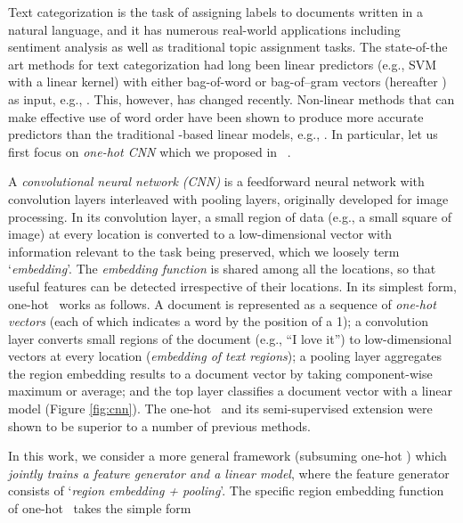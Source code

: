 \documentclass{article}
\begin{document}
Text categorization is the task of assigning labels to documents written in 
a natural language, and it has numerous real-world applications including sentiment analysis 
as well as traditional topic assignment tasks.  
The state-of-the art methods for text categorization had long been linear predictors 
(e.g., SVM with a linear kernel) with either bag-of-word or bag-of--gram vectors 
(hereafter {\em \bow}) as input, 
e.g., \cite{J98,LYRL04}. 
This, however, has changed recently.  
Non-linear methods that can make effective use of word order 
have been shown to produce more accurate predictors than the traditional \bow-based linear models, e.g., 
\cite{DL15,ZZC15}.  
In particular, let us first focus on {\em one-hot CNN} which we proposed in \JZab\ \cite{JZ15a,JZ15b}.

A {\em convolutional neural network (CNN)} 
\cite{LeCun+etal98} is a feedforward neural network with convolution layers interleaved with pooling layers, 
originally developed for image processing.  
In its convolution layer, a small region of data (e.g., a small square of image) at every location 
is converted to a low-dimensional vector with information relevant to the task being preserved, 
which we loosely term `{\em embedding}'.  
The {\em embedding function} is shared among all the locations, 
so that useful features can be detected irrespective of their locations.  
In its simplest form, one-hot \cnn\ works as follows. 
A document is represented as a sequence of {\em one-hot vectors} 
(each of which indicates a word by the position of a 1); 
a convolution layer converts small regions of the document (e.g., ``I love it'') to low-dimensional vectors at every location 
({\em embedding of text regions}); 
a pooling layer aggregates the region embedding results to a document vector
by taking component-wise maximum or average; and 
the top layer classifies a document vector with a linear model (Figure \ref{fig:cnn}). 
The one-hot \cnn\ and its semi-supervised extension were shown to be
superior to a number of previous methods. 


In this work, we consider a more general framework (subsuming one-hot \cnn) which 
{\em jointly trains a feature generator and a linear model}, where the 
feature generator consists of `{\em region embedding + pooling}'. 
The specific region embedding function 
of one-hot \cnn\ 
takes the simple form
\newcommand{\cnnAct}[1]{\max(0,#1)}
\end{document}
